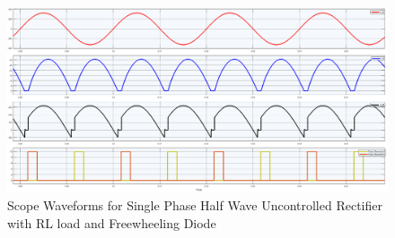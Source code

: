\begin{figure}[h]
    \centering
    \includegraphics[width=1\textwidth]{images/experiment-2/circuit-scope-simulation-03.png}
    \caption{Scope Waveforms for Single Phase Half Wave Uncontrolled Rectifier with RL load and Freewheeling Diode}
    \label{Fig_waveform_single-phase-full-wave-controlled-rectifier-with-RL-load}
\end{figure}


\pagebreak

